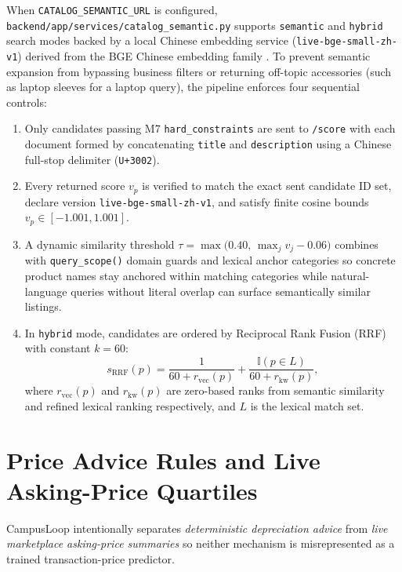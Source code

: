 When \texttt{CATALOG\_\allowbreak SEMANTIC\_URL} is configured, \texttt{backend/\allowbreak app/\allowbreak services/\allowbreak catalog\_\allowbreak semantic.py} supports \texttt{semantic} and \texttt{hybrid} search modes backed by a local Chinese embedding service (\texttt{live-bge-small-zh-v1}) derived from the BGE Chinese embedding family \cite{xiao2024bge}. To prevent semantic expansion from bypassing business filters or returning off-topic accessories (such as laptop sleeves for a laptop query), the pipeline enforces four sequential controls:
\begin{enumerate}
  \item Only candidates passing M7 \texttt{hard\_constraints} are sent to \texttt{/score} with each document formed by concatenating \texttt{title} and \texttt{description} using a Chinese full-stop delimiter (\texttt{U+3002}).
  \item Every returned score $v_p$ is verified to match the exact sent candidate ID set, declare version \texttt{live-bge-small-zh-v1}, and satisfy finite cosine bounds $v_p \in [-1.001, 1.001]$.
  \item A dynamic similarity threshold $\tau = \max\bigl(0.40,\, \max_j v_j - 0.06\bigr)$ combines with \texttt{query\_scope()} domain guards and lexical anchor categories so concrete product names stay anchored within matching categories while natural-language queries without literal overlap can surface semantically similar listings.
  \item In \texttt{hybrid} mode, candidates are ordered by Reciprocal Rank Fusion (RRF) \cite{cormack2009rrf} with constant $k = 60$:
  \begin{equation}
    s_{\text{RRF}}(p) = \frac{1}{60 + r_{\text{vec}}(p)} + \frac{\mathbb{I}\!\left(p \in L\right)}{60 + r_{\text{kw}}(p)},
    \label{eq:rrf}
  \end{equation}
  where $r_{\text{vec}}(p)$ and $r_{\text{kw}}(p)$ are zero-based ranks from semantic similarity and refined lexical ranking respectively, and $L$ is the lexical match set.
\end{enumerate}

\section{Price Advice Rules and Live Asking-Price Quartiles}
\label{sec:ai-price}

CampusLoop intentionally separates \emph{deterministic depreciation advice} from \emph{live marketplace asking-price summaries} so neither mechanism is misrepresented as a trained transaction-price predictor.

